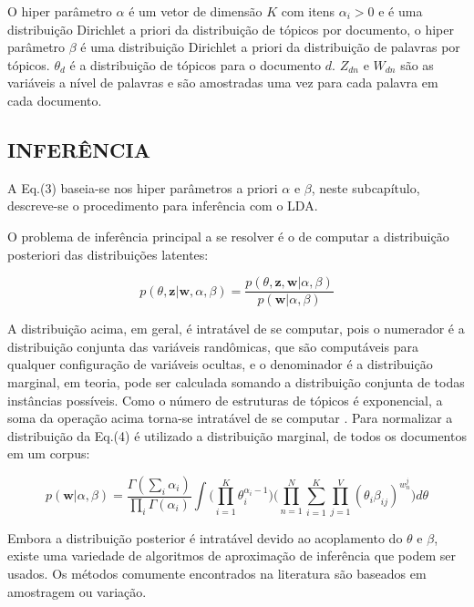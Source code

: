 \documentclass[12pt,a4paper]{article}
\begin{document}
O hiper parâmetro $\alpha$ é um vetor de dimensão $K$ com itens \(\alpha _i>0\) e é uma distribuição Dirichlet a priori da distribuição de tópicos por documento,
o hiper parâmetro $\beta$ é uma distribuição Dirichlet a priori da distribuição de palavras por tópicos. $\theta _d$ é a distribuição de tópicos para o documento $d$. $Z_{dn}$ e $W_{dn}$ são as variáveis a nível de palavras e são amostradas uma vez para cada palavra em cada documento.


\subsection{INFERÊNCIA} \label{sec:inferencia}
A Eq.(3) baseia-se nos hiper parâmetros a priori $\alpha$ e $\beta$, neste subcapítulo, descreve-se o procedimento para inferência com o LDA.

O problema de inferência principal a se resolver é o de  computar a distribuição posteriori das distribuições latentes:

\begin{equation}
p(\theta,\textbf{z}|\textbf{w},\alpha,\beta) = \frac{p(\theta,\textbf{z},\textbf{w}|\alpha,\beta)}{p(\textbf{w}|\alpha,\beta)}
\end{equation}

A distribuição acima, em geral, é intratável de se computar, pois o numerador é a distribuição conjunta das variáveis randômicas, que são computáveis para qualquer configuração de variáveis ocultas, e
 o denominador é a distribuição marginal, em teoria, pode ser calculada somando a distribuição conjunta de todas instâncias possíveis. Como o número de estruturas de tópicos é exponencial, a soma da operação acima torna-se intratável de se computar \cite{blei2012probabilistic}. Para normalizar a distribuição da Eq.(4) é utilizado a distribuição marginal,
 de todos os documentos em um corpus:

\begin{equation}
p(\textbf{w}|\alpha,\beta)=\frac{\Gamma(\sum_{i}\alpha_i)}{\prod_{i}\Gamma(\alpha_i)}\int{\Bigg(\prod_{i=1}^{K}\theta_i^{\alpha_i-1}\Bigg)} \Bigg(\prod_{n=1}^{N}\sum_{i=1}^{K}\prod_{j=1}^{V}(\theta_i\beta_{ij})^{w_n^j}\Bigg)d\theta
\end{equation}

Embora a distribuição posterior é intratável devido ao acoplamento do $\theta$ e $\beta$, existe uma variedade de algoritmos de aproximação de inferência que podem ser usados. Os métodos comumente encontrados na literatura são baseados em amostragem ou variação.
\end{document}
